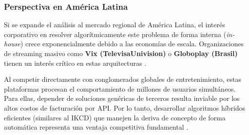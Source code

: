 \documentclass[12pt]{article}
\begin{document}
\subsubsection*{Perspectiva en América Latina}
Si se expande el análisis al mercado regional de América Latina, el interés corporativo en resolver algorítmicamente este problema de forma interna (\textit{in-house}) crece exponencialmente debido a las economías de escala. Organizaciones de streaming masivo como \textbf{Vix (TelevisaUnivision)} o \textbf{Globoplay (Brasil)} tienen un interés crítico en estas arquitecturas \cite{boeira_globo} \cite{vix_televisaunivision}. 

Al competir directamente con conglomerados globales de entretenimiento, estas plataformas procesan el comportamiento de millones de usuarios simultáneos. Para ellas, depender de soluciones genéricas de terceros resulta inviable por los altos costos de facturación por API. Por lo tanto, desarrollar algoritmos híbridos eficientes (similares al IKCD) que manejen la deriva de concepto de forma automática representa una ventaja competitiva fundamental \cite{boeira_globo} \cite{vix_televisaunivision}.





\end{document}
